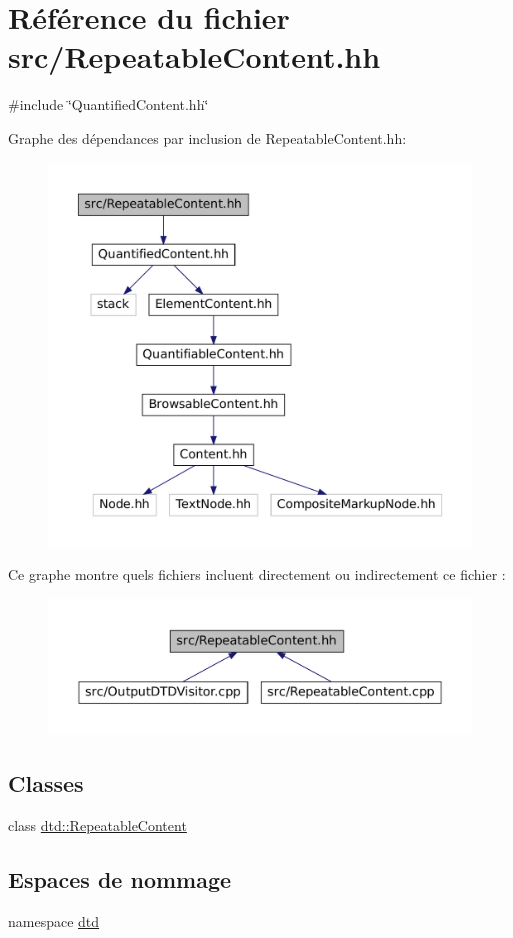 \hypertarget{_repeatable_content_8hh}{
\section{Référence du fichier src/RepeatableContent.hh}
\label{_repeatable_content_8hh}
}
{\ttfamily \#include \char`\"{}QuantifiedContent.hh\char`\"{}}\par
Graphe des dépendances par inclusion de RepeatableContent.hh:\nopagebreak
\begin{figure}[H]
\begin{center}
\leavevmode
\includegraphics[width=400pt]{_repeatable_content_8hh__incl}
\end{center}
\end{figure}
Ce graphe montre quels fichiers incluent directement ou indirectement ce fichier :\nopagebreak
\begin{figure}[H]
\begin{center}
\leavevmode
\includegraphics[width=400pt]{_repeatable_content_8hh__dep__incl}
\end{center}
\end{figure}
\subsection*{Classes}
\begin{DoxyCompactItemize}
\item 
class \hyperlink{classdtd_1_1_repeatable_content}{dtd::RepeatableContent}
\end{DoxyCompactItemize}
\subsection*{Espaces de nommage}
\begin{DoxyCompactItemize}
\item 
namespace \hyperlink{namespacedtd}{dtd}
\end{DoxyCompactItemize}
